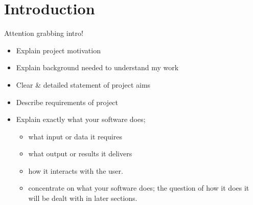 %
%
%
\chapter{Introduction}
\label{chap:introduction}
Attention grabbing intro!

% 
%

\begin{itemize}
\item Explain project motivation
\item Explain background needed to understand my work
\item Clear \& detailed statement of project aims
\item Describe requirements of project
\item Explain exactly what your software does; 
  \begin{itemize}
  \item what input or data it requires
  \item what output or results it delivers
  \item how it interacts with the user.
  \item concentrate on what your software does; the question of how it
    does it will be dealt with in later sections.
  \end{itemize}
\end{itemize}


